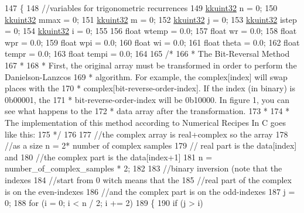 \begin{DoxyCode}
147 \{
148   \textcolor{comment}{//variables for trigonometric recurrences}
149   \hyperlink{namespace_k_k_b_af8d832f05c54994a1cce25bd5743e19a}{kkuint32}  n = 0;
150   \hyperlink{namespace_k_k_b_af8d832f05c54994a1cce25bd5743e19a}{kkuint32}  mmax = 0;
151   \hyperlink{namespace_k_k_b_af8d832f05c54994a1cce25bd5743e19a}{kkuint32}  m = 0;
152   \hyperlink{namespace_k_k_b_af8d832f05c54994a1cce25bd5743e19a}{kkuint32}  j = 0;
153   \hyperlink{namespace_k_k_b_af8d832f05c54994a1cce25bd5743e19a}{kkuint32}  istep = 0; 
154   \hyperlink{namespace_k_k_b_af8d832f05c54994a1cce25bd5743e19a}{kkuint32}  i = 0;
155 
156   \textcolor{keywordtype}{float}  wtemp  = 0.0;
157   \textcolor{keywordtype}{float}  wr     = 0.0;
158   \textcolor{keywordtype}{float}  wpr    = 0.0;
159   \textcolor{keywordtype}{float}  wpi    = 0.0;
160   \textcolor{keywordtype}{float}  wi     = 0.0;
161   \textcolor{keywordtype}{float}  theta  = 0.0;
162   \textcolor{keywordtype}{float}  tempr  = 0.0;
163   \textcolor{keywordtype}{float}  tempi  = 0.0;
164 
165   \textcolor{comment}{/*}
166 \textcolor{comment}{   * The Bit-Reversal Method}
167 \textcolor{comment}{   *}
168 \textcolor{comment}{   * First, the original array must be transformed in order to perform the Danielson-Lanzcos }
169 \textcolor{comment}{   * algorithm. For example, the complex[index] will swap places with the }
170 \textcolor{comment}{   * complex[bit-reverse-order-index]. If the index (in binary) is 0b00001, the }
171 \textcolor{comment}{   * bit-reverse-order-index will be 0b10000. In figure 1, you can see what happens to the }
172 \textcolor{comment}{   * data array after the transformation.}
173 \textcolor{comment}{   *}
174 \textcolor{comment}{   * The implementation of this method according to Numerical Recipes In C goes like this:}
175 \textcolor{comment}{   */}
176 
177   \textcolor{comment}{//the complex array is real+complex so the array }
178   \textcolor{comment}{//as a size n = 2* number of complex samples}
179   \textcolor{comment}{// real part is the data[index] and }
180   \textcolor{comment}{//the complex part is the data[index+1]}
181   n = number\_of\_complex\_samples * 2; 
182 
183   \textcolor{comment}{//binary inversion (note that the indexes }
184   \textcolor{comment}{//start from 0 witch means that the}
185   \textcolor{comment}{//real part of the complex is on the even-indexes }
186   \textcolor{comment}{//and the complex part is on the odd-indexes}
187   j = 0;
188   \textcolor{keywordflow}{for}  (i = 0;  i < n / 2;  i += 2)
189   \{
190     \textcolor{keywordflow}{if}  (j > i) 

\end{DoxyCode}
